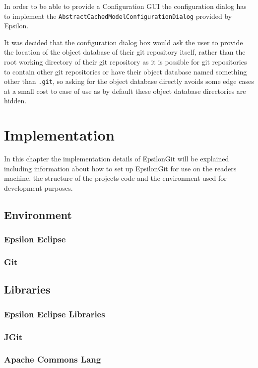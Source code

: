 \documentclass[11pt]{book}
\newcommand{\code}[1]{\texttt{#1}}
\begin{document}
In order to be able to provide a Configuration GUI the configuration dialog has to implement the \code{AbstractCachedModelConfigurationDialog} provided by Epsilon.

It was decided that the configuration dialog box would ask the user to provide the location of the object database of their git repository itself, rather than the root working directory of their git repository as it is possible for git repositories to contain other git repositories or have their object database named something other than \code{.git}, so asking for the object database directly avoids some edge cases at a small cost to ease of use as by default these object database directories are hidden.

\chapter{Implementation}
In this chapter the implementation details of EpsilonGit will be explained including information about how to set up EpsilonGit for use on the readers machine, the structure of the projects code and the environment used for development purposes.


\section{Environment}
\subsection{Epsilon Eclipse}
\subsection{Git}

\section{Libraries}
\subsection{Epsilon Eclipse Libraries}
\subsection{JGit}
\subsection{Apache Commons Lang}
\end{document}
